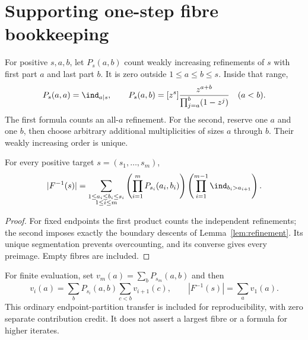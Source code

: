 \section{Supporting one-step fibre bookkeeping}\label{sec:fibres}
For positive $s,a,b$, let $P_s(a,b)$ count weakly increasing refinements
of $s$ with first part $a$ and last part $b$. It is zero outside
$1\le a\le b\le s$. Inside that range,
\begin{equation}\label{eq:partition}
 P_s(a,a)=\ind_{a\mid s},\qquad
 P_s(a,b)=[z^s]\frac{z^{a+b}}{\prod_{j=a}^b(1-z^j)}\quad(a<b).
\end{equation}
The first formula counts an all-$a$ refinement. For the second, reserve
one $a$ and one $b$, then choose arbitrary additional multiplicities of
sizes $a$ through $b$. Their weakly increasing order is unique.

\begin{proposition}\label{prop:fibres}
For every positive target $s=(s_1,\ldots,s_m)$,
\[
 |F^{-1}(s)|=
 \sum_{\substack{1\le a_i\le b_i\le s_i\\1\le i\le m}}
 \left(\prod_{i=1}^mP_{s_i}(a_i,b_i)\right)
 \left(\prod_{i=1}^{m-1}\ind_{b_i>a_{i+1}}\right).
\]
\end{proposition}
\begin{proof}
For fixed endpoints the first product counts the independent refinements;
the second imposes exactly the boundary descents of
Lemma~\ref{lem:refinement}. Its unique segmentation prevents overcounting,
and its converse gives every preimage. Empty fibres are included.
\end{proof}
For finite evaluation, set $v_m(a)=\sum_bP_{s_m}(a,b)$ and then
\[
 v_i(a)=\sum_bP_{s_i}(a,b)\sum_{c<b}v_{i+1}(c),\qquad
 |F^{-1}(s)|=\sum_a v_1(a).
\]
This ordinary endpoint-partition transfer is included for reproducibility,
with zero separate contribution credit. It does not assert a largest fibre
or a formula for higher iterates.
